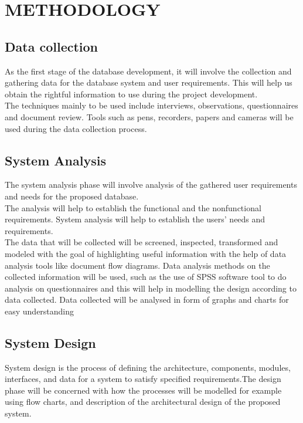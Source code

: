 \documentclass[11pt]{article} %
\begin{document}
\section{METHODOLOGY}

\subsection{Data collection}
As the first stage of the database development, it will involve the collection and gathering data for the  database system and user requirements. This will help us obtain the rightful information to use during the project development.\\ The techniques mainly to be used include interviews, observations, questionnaires and document review. Tools such as pens, recorders, papers and cameras will be used during the data collection process.\\
\subsection{System Analysis}

The system analysis phase will involve analysis of the gathered user requirements and needs for the proposed  database.\\ The analysis will help to establish the functional and the nonfunctional requirements. System analysis will help to establish the users’ needs and requirements.\\The data that will be collected will be screened, inspected, transformed and modeled with the goal of highlighting useful information with the help of data analysis tools like document flow diagrams. Data analysis methods on the collected information will be used, such as the use of SPSS software tool to do analysis on questionnaires and this will help in modelling the design according to data collected. Data collected will be analysed in form of graphs and charts for easy understanding 

\subsection{System Design}
System design is the process of defining the architecture, components, modules, interfaces, and data for a system to satisfy specified requirements.The design phase will be concerned with how the processes will be modelled for example using flow charts, and description of the architectural design of the proposed system.
\end{document}
